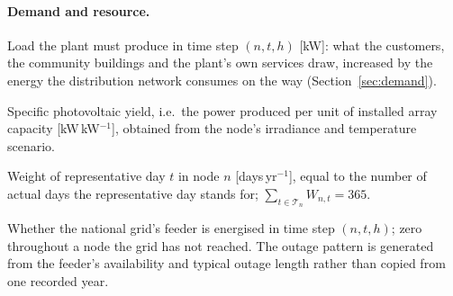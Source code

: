 \documentclass[11pt,a4paper]{article}
\theoremstyle{plain}
\theoremstyle{definition}
\begin{document}
\paragraph{Demand and resource.}
\begin{description}[leftmargin=3.0cm,style=nextline]
  \item[$D_{n,t,h}$] Load the plant must produce in time step $(n,t,h)$ [kW]: what the
  customers, the community buildings and the plant's own services draw, increased by the
  energy the distribution network consumes on the way (Section~\ref{sec:demand}).
  \item[$Y_{n,t,h}$] Specific photovoltaic yield, i.e.\ the power produced per unit of
  installed array capacity [kW\,kW$^{-1}$], obtained from the node's irradiance and
  temperature scenario.
  \item[$W_{n,t}$] Weight of representative day $t$ in node $n$ [days\,yr$^{-1}$], equal
  to the number of actual days the representative day stands for; $\sum_{t\in
  \mathcal{T}_n} W_{n,t}=365$.
  \item[{$G^{\mathrm{on}}_{n,t,h}\in\{0,1\}$}] Whether the national grid's feeder is
  energised in time step $(n,t,h)$; zero throughout a node the grid has not reached. The
  outage pattern is generated from the feeder's availability and typical outage length
  rather than copied from one recorded year.
\end{description}
\end{document}
